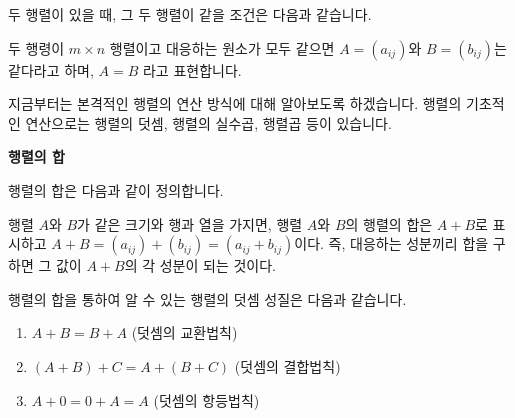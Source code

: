 \begin{flushleft}
    두 행렬이 있을 때, 그 두 행렬이 같을 조건은 다음과 같습니다.
\end{flushleft}

\begin{tcolorbox}[colback = white, colframe = Definition, title = \textmd{정의: 두 행렬의 같음}]
    두 행령이 $m \times n$ 행렬이고 대응하는 원소가 모두 같으면 $A = (a_{ij})$와 $B = (b_{ij})$는 같다라고 하며, $A = B$ 라고 표현합니다.
\end{tcolorbox}

\newpage

\begin{flushleft}
    지금부터는 본격적인 행렬의 연산 방식에 대해 알아보도록 하겠습니다. 행렬의 기초적인 연산으로는 행렬의 덧셈, 행렬의 실수곱, 행렬곱 등이 있습니다.
\end{flushleft}

\begin{flushleft}
    {\textcolor{subheader}{{\LARGE\textbf{행렬의 합}}}}
\end{flushleft}

\begin{flushleft}
    행렬의 합은 다음과 같이 정의합니다.
\end{flushleft}

\begin{tcolorbox}[colback = white, colframe = Definition, title = \textmd{정의: 행렬의 합}]
    행렬 $A$와 $B$가 같은 크기와 행과 열을 가지면, 행렬 $A$와 $B$의 행렬의 합은 $A + B$로 표시하고 $A + B = (a_{ij}) + (b_{ij}) = (a_{ij}+b_{ij})$이다. 즉, 대응하는 성분끼리 합을 구하면 그 값이 $A + B$의 각 성분이 되는 것이다.
\end{tcolorbox}

\begin{flushleft}
    행렬의 합을 통하여 알 수 있는 행렬의 덧셈 성질은 다음과 같습니다.
\end{flushleft}

\begin{tcolorbox}[colback = white, colframe = Theorem, title = \textmd{정리: 행렬의 덧셈 성질}]
    \begin{enumerate}
        \item $A + B = B + A$    (덧셈의 교환법칙)
        \item $(A + B) + C = A + (B + C)$    (덧셈의 결합법칙)
        \item $A + 0 = 0 + A = A$    (덧셈의 항등법칙)
    \end{enumerate}
\end{tcolorbox}

